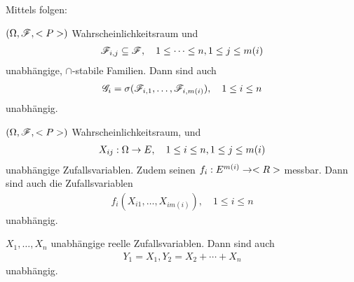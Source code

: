 Mittels  folgen:

\begin{conclusion}
	$(\Omega,\mathscr{F},<P>)$ Wahrscheinlichkeitsraum und
	\begin{align*}
		\mathscr{F}_{i,j} \subseteq \mathscr{F}, \quad 1 \le \dots \le n, 1 \le j \le m(i)
	\end{align*}
	unabhängige, $\cap$-stabile Familien.
	Dann sind auch
	\begin{align*}
		\mathscr{G}_i = \sigma(\mathscr{F}_{i,1},\dots, \mathscr{F}_{i,m(i)}), \quad 1 \le i \le n
	\end{align*}
	unabhängig.
\end{conclusion}

\begin{conclusion}
	$(\Omega,\mathscr{F},<P>)$ Wahrscheinlichkeitsraum, und
	\begin{align*}
		X_{ij}: \Omega \to E, \quad 1 \le i \le n, 1 \le j \le m(i)
	\end{align*}
	unabhängige Zufallsvariablen. Zudem seinen $f_i: E^{m(i)} \to <R>$ messbar. Dann sind auch die Zufallsvariablen
	\begin{align*}
		f_i(X_{i1}, \dots, X_{im(i)}), \quad 1 \le i \le n
	\end{align*}
	unabhängig.
\end{conclusion}

\begin{example}
	$X_1, \dots, X_n$ unabhängige reelle Zufallsvariablen. Dann sind auch
	\begin{align*}
		Y_1 = X_1, Y_2 = X_2 + \cdots + X_n
	\end{align*}
	unabhängig.
\end{example}